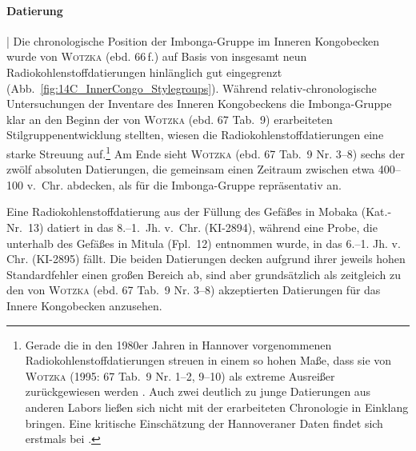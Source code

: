 \paragraph{Datierung}\hspace{-.5em}|\hspace{.5em}%
Die chronologische Position der Imbonga-Gruppe im Inneren Kongobecken wurde von \textsc{Wotzka} (ebd. 66\,f.) auf Basis von insgesamt neun Radiokohlenstoffdatierungen hinlänglich gut eingegrenzt (Abb.~\ref{fig:14C_InnerCongo_Stylegroups}). Während relativ-chronologische Untersuchungen der Inventare des Inneren Kongobeckens die Imbonga-Gruppe klar an den Beginn der von \textsc{Wotzka} (ebd. 67 Tab.~9) erarbeiteten Stilgruppenentwicklung stellten, wiesen die Radiokohlenstoffdatierungen eine starke Streuung auf.\footnote{Gerade die in den 1980er Jahren in Hannover vorgenommenen Radiokohlenstoffdatierungen streuen in einem so hohen Maße, dass sie von \textsc{Wotzka} (1995: 67 Tab.~9 Nr. 1--2, 9--10) als extreme Ausreißer zurückgewiesen werden \parencite[siehe][]{Geyh.1990}. Auch zwei deutlich zu junge Datierungen aus anderen Labors \parencite[67 Tab.~9 Nr. 11--12]{Wotzka.1995} ließen sich nicht mit der erarbeiteten Chronologie in Einklang bringen. Eine kritische Einschätzung der Hannoveraner Daten findet sich erstmals bei \textcite[132\,f.]{Eggert.1987c}.} Am Ende sieht \textsc{Wotzka} (ebd. 67 Tab.~9 Nr. 3--8) sechs der zwölf absoluten Datierungen, die gemeinsam einen Zeitraum zwischen etwa 400--100 v.~Chr. abdecken, als für die Imbonga-Gruppe repräsentativ an.

Eine Radiokohlenstoffdatierung aus der Füllung des Gefäßes in Mobaka (Kat.-Nr.~13) datiert in das \mbox{8.--1.~Jh.} v.~Chr. (KI-2894), während eine Probe, die unterhalb des Gefäßes in Mitula (Fpl.~12) entnommen wurde, in das 6.--1. Jh. v. Chr. (KI-2895) fällt. Die beiden Datierungen decken aufgrund ihrer jeweils hohen Standardfehler einen großen Bereich ab, sind aber grundsätzlich als zeitgleich zu den von \textsc{Wotzka} (ebd. 67 Tab.~9 Nr. 3--8) akzeptierten Datierungen für das Innere Kongobecken anzusehen. 


